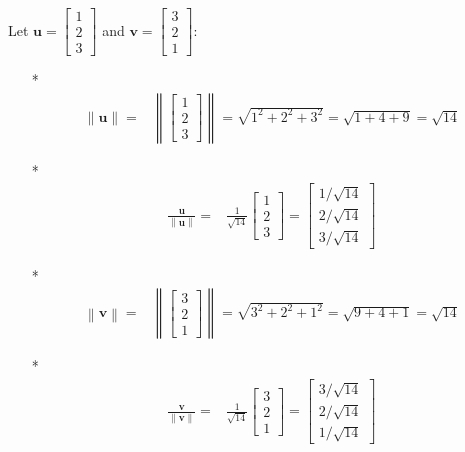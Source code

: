 \documentclass{article}
\begin{document}
Let \(\mathbf{u} = \begin{bmatrix} 1 \\ 2 \\ 3 \end{bmatrix}\) and \(\mathbf{v} = \begin{bmatrix} 3 \\ 2 \\ 1 \end{bmatrix}\):
\begin{itemize}
\item[*] \begin{align*}
\left\|\mathbf{u}\right\| = & \left\|\begin{bmatrix} 1 \\ 2 \\ 3 \end{bmatrix}\right\|  
= \sqrt{1^2 + 2^2 + 3^2} 
= \sqrt{1 + 4 + 9} 
= \sqrt{14}
\end{align*}
\item[*] \begin{align*}
\frac{\mathbf{u}}{\left\|\mathbf{u}\right\|} = & \frac{1}{\sqrt{14}}\begin{bmatrix} 1 \\ 2 \\ 3 \end{bmatrix} 
= \begin{bmatrix} 1/\sqrt{14} \\ 2/\sqrt{14} \\ 3/\sqrt{14} \end{bmatrix}
\end{align*}
\item[*] \begin{align*}
\left\|\mathbf{v}\right\| = & \left\|\begin{bmatrix} 3 \\ 2 \\ 1 \end{bmatrix}\right\|  
= \sqrt{3^2 + 2^2 + 1^2} 
= \sqrt{9 + 4 + 1} 
= \sqrt{14}
\end{align*}
\item[*] \begin{align*}
\frac{\mathbf{v}}{\left\|\mathbf{v}\right\|} = & \frac{1}{\sqrt{14}}\begin{bmatrix} 3 \\ 2 \\ 1 \end{bmatrix} 
= \begin{bmatrix} 3/\sqrt{14} \\ 2/\sqrt{14} \\ 1/\sqrt{14} \end{bmatrix}

\end{align*}
\end{itemize}
\end{document}
